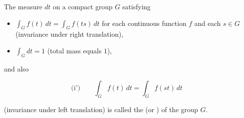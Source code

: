 The measure $dt$ on a compact group $G$ satisfying

\begin{itemize}
\item[(i)] $\displaystyle\int_G f(t)\,dt = \int_G f(ts)\,dt$ for each continuous function $f$ and each $s \in G$ (invariance under right translation),
\item[(ii)] $\displaystyle\int_G dt = 1$ (total mass equals $1$),
\end{itemize}

and also

\[
\text{(i')}\qquad \int_G f(t)\,dt = \int_G f(st)\,dt
\]

(invariance under left translation) is called the  (or ) of the group $G$.
